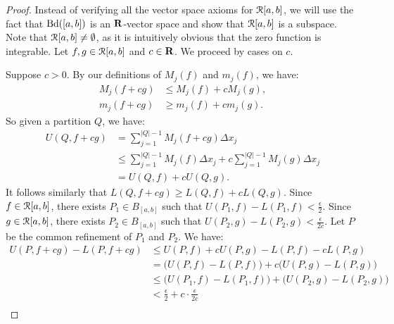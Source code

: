 \documentclass[10pt,twoside,openany]{memoir}
\begin{document}
        \begin{proof}
            Instead of verifying all the vector space axioms for $\mathcal{R}[a,b]$, we will use the fact that $\operatorname{Bd}([a,b])$ is an $\mathbf{R}$-vector space and show that $\mathcal{R}[a,b]$ is a subspace. Note that $\mathcal{R}[a,b] \neq \emptyset$, as it is intuitively obvious that the zero function is integrable. Let $f,g \in \mathcal{R}[a,b]$ and $c \in \mathbf{R}$. We proceed by cases on $c$.
            
            Suppose $c > 0$. By our definitions of $M_j(f)$ and $m_j(f)$, we have:
                \begin{equation*}
                \begin{split}
                    M_j(f+cg) &\leq M_j(f) + cM_j(g), \\
                    m_j(f+cg) &\geq m_j(f) + cm_j(g).
                \end{split}
                \end{equation*}
            So given a partition $Q$, we have:
                \begin{equation*}
                \begin{split}
                    U(Q,f+cg)
                    & = \sum_{j = 1}^{|Q|-1}M_j(f+cg)\Delta x_j \\
                    & \leq \sum_{j = 1}^{|Q|-1}M_j(f)\Delta x_j+c\sum_{j = 1}^{|Q|-1}M_j(g)\Delta x_j \\
                    & = U(Q,f) + cU(Q,g).
                \end{split}
                \end{equation*}
            It follows similarly that $L(Q,f+cg) \geq L(Q,f) + cL(Q,g)$. Since $f \in \mathcal{R}[a,b]$, there exists $P_1 \in B_{[a,b]}$ such that $U(P_1,f) - L(P_1,f) < \frac{\epsilon}{2}$. Since $g \in \mathcal{R}[a,b]$, there exists $P_2 \in B_{[a,b]}$ such that $U(P_2,g) - L(P_2,g) < \frac{\epsilon}{2c}$. Let $P$ be the common refinement of $P_1$ and $P_2$. We have:
                \begin{equation*}
                \begin{split}
                    U(P,f+cg) - L(P,f+cg) 
                    & \leq U(P,f) + cU(P,g) - L(P,f) - cL(P,g) \\
                    & = \bigl(U(P,f) - L(P,f)\bigr) + c \bigl(U(P,g) - L(P,g)\bigr) \\
                    & \leq \bigl(U(P_1,f) - L(P_1,f)\bigr) + \bigl(U(P_2,g) - L(P_2,g)\bigr) \\
                    & < \frac{\epsilon}{2} + c\cdot\frac{\epsilon}{2c} \\

\end{split}
\end{equation*}
\end{proof}
\end{document}
